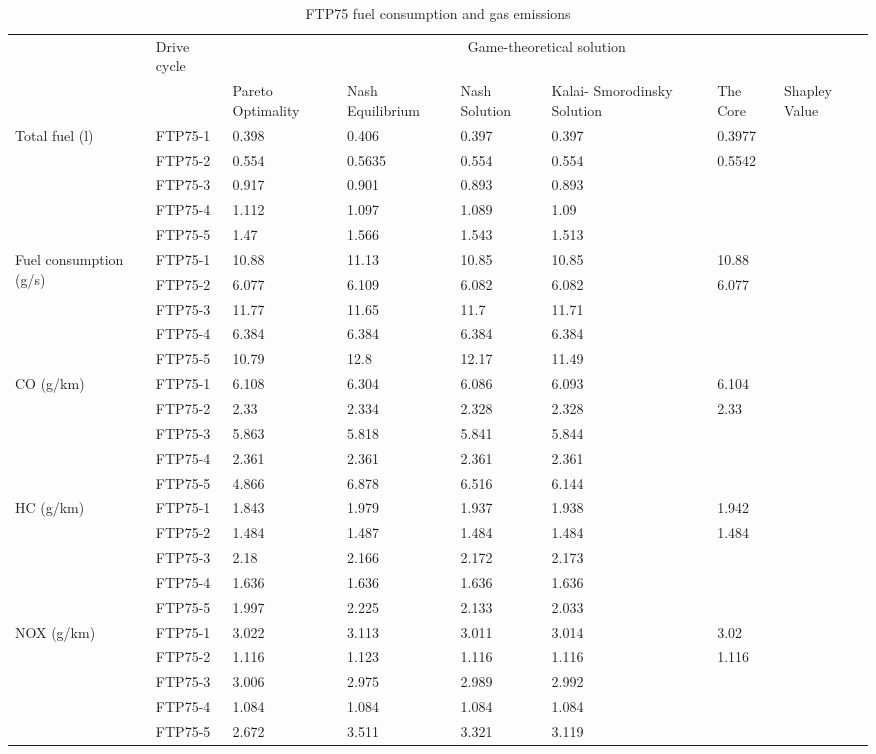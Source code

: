 \begin{table}[h]
\centering
\begin{tabular}{ |p{1.5cm}|p{1.5cm}|p{1.3cm}|p{1.3cm}|p{1.3cm}|p{1.3cm}|p{1.3cm}|p{1.3cm}|} 
 \hline
  \cline{3-8}
   & Drive cycle & \multicolumn{6}{|c|}{Game-theoretical solution} \\
   \cline{3-8}
   & & Pareto Optimality & Nash Equilibrium & Nash Solution & Kalai- Smorodinsky Solution & The Core & Shapley Value\\
 \hline\hline
 \multirow{5}{*}{\parbox{1.5cm}{Total fuel (l)}} 
 & FTP75-1 & 0.398 & 0.406 & 0.397 & 0.397 & 0.3977 & \\ 
 & FTP75-2 & 0.554 & 0.5635 & 0.554 & 0.554 & 0.5542 & \\  
 & FTP75-3 & 0.917 & 0.901 & 0.893 & 0.893 & & \\ 
 & FTP75-4 & 1.112 & 1.097 & 1.089 & 1.09 & & \\ 
 & FTP75-5 & 1.47 & 1.566 & 1.543 & 1.513 & &\\ 
 \hline 
 \multirow{5}{*}{\parbox{1.5cm}{Fuel consumption (g/s)}} 
 & FTP75-1 & 10.88 & 11.13 & 10.85 & 10.85 & 10.88 &\\ 
 & FTP75-2 & 6.077 & 6.109 & 6.082 & 6.082 & 6.077 &\\ 
 & FTP75-3 & 11.77 & 11.65 & 11.7 & 11.71 & & \\ 
 & FTP75-4 & 6.384 & 6.384 & 6.384 & 6.384 & &\\ 
 & FTP75-5 & 10.79 & 12.8 & 12.17 & 11.49 & & \\ 
 \hline
 \multirow{5}{*}{\parbox{1.5cm}{CO (g/km)}} 
 & FTP75-1 & 6.108 & 6.304 & 6.086 & 6.093 & 6.104 & \\ 
 & FTP75-2 & 2.33 & 2.334 & 2.328 & 2.328 & 2.33 & \\ 
 & FTP75-3 & 5.863 & 5.818 & 5.841 & 5.844 & & \\ 
 & FTP75-4 & 2.361 & 2.361 & 2.361 & 2.361 & & \\ 
 & FTP75-5 & 4.866 & 6.878 & 6.516 & 6.144 & & \\  
 \hline 
 \multirow{5}{*}{\parbox{1.5cm}{HC (g/km)}} 
 & FTP75-1 & 1.843 & 1.979 & 1.937 & 1.938 & 1.942 & \\ 
 & FTP75-2 & 1.484 & 1.487 & 1.484 & 1.484 & 1.484 & \\  
 & FTP75-3 & 2.18 & 2.166 & 2.172 & 2.173 & & \\ 
 & FTP75-4 & 1.636 & 1.636 & 1.636 & 1.636 & & \\ 
 & FTP75-5 & 1.997 & 2.225 & 2.133 & 2.033 & & \\  
 \hline
 \multirow{5}{*}{\parbox{1.5cm}{NOX (g/km)}} 
 & FTP75-1 & 3.022 & 3.113 & 3.011 & 3.014 & 3.02 & \\
 & FTP75-2 & 1.116 & 1.123 & 1.116 & 1.116 & 1.116 & \\ 
 & FTP75-3 & 3.006 & 2.975 & 2.989 & 2.992 & & \\ 
 & FTP75-4 & 1.084 & 1.084 & 1.084 & 1.084 & & \\ 
 & FTP75-5 & 2.672 & 3.511 & 3.321 & 3.119 & & \\ 
 \hline  
\end{tabular}
\caption{FTP75 fuel consumption and gas emissions}
\label{tab:fuelEmis}
\end{table}


